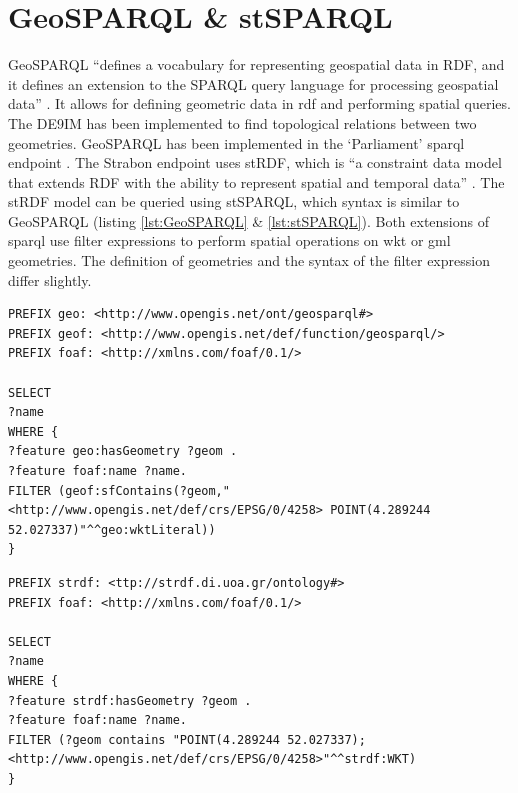 \section{GeoSPARQL \& stSPARQL}
\label{par:SpatialFilters}
GeoSPARQL \enquote{defines a vocabulary for representing geospatial data in RDF, and it defines an extension to the SPARQL query language for processing geospatial data} \cite[p. xvi]{LD:OGC}. It allows for defining geometric data in \ac{rdf} and performing spatial queries. The \ac{DE9IM} \citep{GIS:9IM} has been implemented to find topological relations between two geometries. GeoSPARQL has been implemented in the `Parliament' \ac{sparql} endpoint \citep{LD:GeoSPARQL}. The Strabon endpoint uses stRDF, which is \enquote{a constraint data model that extends RDF with the ability to represent spatial and temporal data} \cite[p. 425]{SSW:Koubarakis}. The stRDF model can be queried using stSPARQL, which syntax is similar to GeoSPARQL (listing \ref{lst:GeoSPARQL} \& \ref{lst:stSPARQL}). Both extensions of \ac{sparql} use filter expressions to perform spatial operations on \ac{wkt} or \ac{gml} geometries. The definition of geometries and the syntax of the filter expression differ slightly.

\begin{lstlisting}[caption={A GeoSPARQL query to find the names of features that contain a point geometry}, label={lst:GeoSPARQL}]
PREFIX geo: <http://www.opengis.net/ont/geosparql#>
PREFIX geof: <http://www.opengis.net/def/function/geosparql/>
PREFIX foaf: <http://xmlns.com/foaf/0.1/> 

SELECT 
?name
WHERE {
?feature geo:hasGeometry ?geom .
?feature foaf:name ?name.
FILTER (geof:sfContains(?geom,"<http://www.opengis.net/def/crs/EPSG/0/4258> POINT(4.289244 52.027337)"^^geo:wktLiteral))
}
\end{lstlisting}

\begin{lstlisting}[caption={A stSPARQL query to find the names of features that contain a point geometry}, label={lst:stSPARQL}]
PREFIX strdf: <ttp://strdf.di.uoa.gr/ontology#>
PREFIX foaf: <http://xmlns.com/foaf/0.1/> 

SELECT 
?name
WHERE {
?feature strdf:hasGeometry ?geom .
?feature foaf:name ?name.
FILTER (?geom contains "POINT(4.289244 52.027337);<http://www.opengis.net/def/crs/EPSG/0/4258>"^^strdf:WKT)
}
\end{lstlisting}

